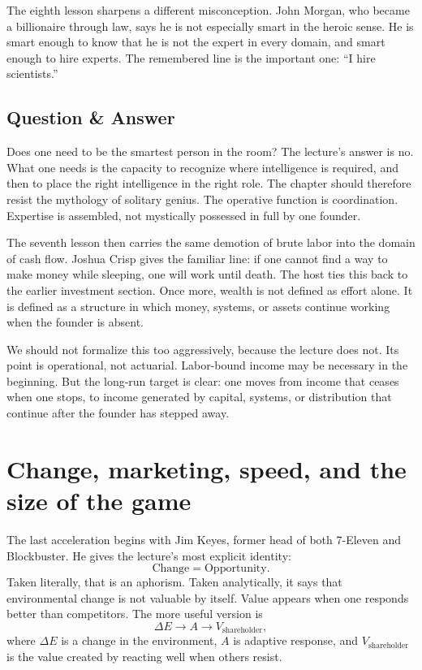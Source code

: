 The eighth lesson sharpens a different misconception. John Morgan, who became a billionaire through law, says he is not especially smart in the heroic sense. He is smart enough to know that he is not the expert in every domain, and smart enough to hire experts. The remembered line is the important one: ``I hire scientists.''

\subsection{Question \& Answer}

Does one need to be the smartest person in the room? The lecture's answer is no. What one needs is the capacity to recognize where intelligence is required, and then to place the right intelligence in the right role. The chapter should therefore resist the mythology of solitary genius. The operative function is coordination. Expertise is assembled, not mystically possessed in full by one founder.

The seventh lesson then carries the same demotion of brute labor into the domain of cash flow. Joshua Crisp gives the familiar line: if one cannot find a way to make money while sleeping, one will work until death. The host ties this back to the earlier investment section. Once more, wealth is not defined as effort alone. It is defined as a structure in which money, systems, or assets continue working when the founder is absent.

We should not formalize this too aggressively, because the lecture does not. Its point is operational, not actuarial. Labor-bound income may be necessary in the beginning. But the long-run target is clear: one moves from income that ceases when one stops, to income generated by capital, systems, or distribution that continue after the founder has stepped away.

\section{Change, marketing, speed, and the size of the game}

The last acceleration begins with Jim Keyes, former head of both 7-Eleven and Blockbuster. He gives the lecture's most explicit identity:
\begin{equation}
\text{Change} = \text{Opportunity}.
\end{equation}
Taken literally, that is an aphorism. Taken analytically, it says that environmental change is not valuable by itself. Value appears when one responds better than competitors. The more useful version is
\begin{equation}
\Delta E \longrightarrow A \longrightarrow V_{\mathrm{shareholder}},
\end{equation}
where \(\Delta E\) is a change in the environment, \(A\) is adaptive response, and \(V_{\mathrm{shareholder}}\) is the value created by reacting well when others resist.

